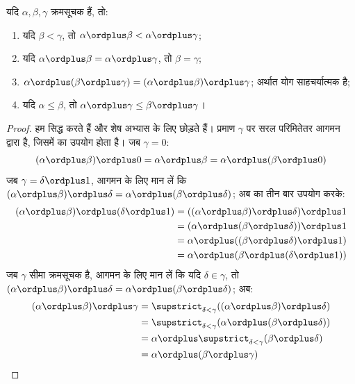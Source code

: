 \documentclass[../../../include/open-logic-section]{subfiles}
\begin{document}
\begin{lem}
यदि $\alpha, \beta, \gamma$ क्रमसूचक हैं, तो:
\begin{enumerate}
	\item{} यदि $\beta < \gamma$, तो
	$\alpha \ordplus \beta < \alpha \ordplus \gamma$;
	\item{} यदि
	$\alpha \ordplus \beta = \alpha\ordplus \gamma$, तो $\beta = \gamma$;
	\item{}  $\alpha \ordplus  (\beta \ordplus
	\gamma) = (\alpha \ordplus \beta) \ordplus \gamma$; अर्थात योग
	साहचर्यात्मक है;
	\item{} यदि $\alpha \leq \beta$, तो
	$\alpha \ordplus \gamma \leq \beta \ordplus \gamma$।
\end{enumerate}
\end{lem}

\begin{proof}
हम  सिद्ध करते हैं और शेष अभ्यास के लिए छोड़ते हैं।
प्रमाण $\gamma$ पर सरल परिमितेतर आगमन द्वारा है, जिसमें
 का उपयोग होता है। जब $\gamma = 0$:
\[
(\alpha \ordplus  \beta) \ordplus  0 = \alpha \ordplus  \beta  = \alpha \ordplus  (\beta \ordplus  0)
\]
जब $\gamma = \delta\ordplus 1$, आगमन के लिए मान लें कि
$(\alpha \ordplus \beta) \ordplus \delta
= \alpha \ordplus (\beta \ordplus \delta)$; अब
 का तीन बार उपयोग करके:
\begin{align*}
	(\alpha \ordplus  \beta) \ordplus  (\delta \ordplus  1) & = ((\alpha \ordplus  \beta) \ordplus  \delta)\ordplus 1\\
	& = (\alpha \ordplus  (\beta \ordplus  \delta)) \ordplus  1\\
	& = \alpha \ordplus  ((\beta \ordplus  \delta)\ordplus 1)\\
	& = \alpha \ordplus  (\beta \ordplus  (\delta\ordplus 1))
\end{align*}	
जब $\gamma$ सीमा क्रमसूचक है, आगमन के लिए मान लें कि यदि
$\delta \in \gamma$, तो
$(\alpha \ordplus \beta) \ordplus \delta
= \alpha \ordplus (\beta \ordplus \delta)$; अब:
\begin{align*}
	(\alpha \ordplus  \beta) \ordplus  \gamma & = \supstrict_{\delta < \gamma}((\alpha \ordplus  \beta) \ordplus  \delta) \\
	&= \supstrict_{\delta < \gamma}(\alpha \ordplus  (\beta \ordplus  \delta))\\
	&= \alpha \ordplus  \supstrict_{\delta < \gamma}(\beta \ordplus  \delta)\\
	& = \alpha \ordplus  (\beta \ordplus  \gamma)
\end{align*}
\end{proof}
\end{document}
